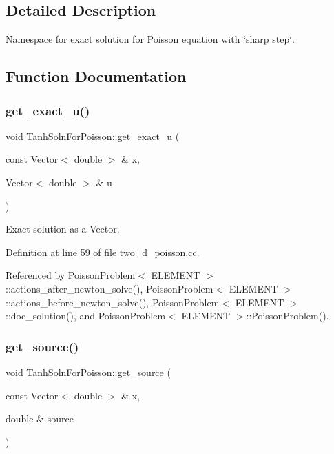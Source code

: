 \subsection{Detailed Description}
Namespace for exact solution for Poisson equation with \char`\"{}sharp step\char`\"{}. 

\subsection{Function Documentation}
\mbox{\label{namespaceTanhSolnForPoisson_af7896e9c18ce6438c73ae2a875e8b7de}} 
\subsubsection{\texorpdfstring{get\+\_\+exact\+\_\+u()}{get\_exact\_u()}}
{\footnotesize\ttfamily void Tanh\+Soln\+For\+Poisson\+::get\+\_\+exact\+\_\+u (\begin{DoxyParamCaption}\item[{const Vector$<$ double $>$ \&}]{x,  }\item[{Vector$<$ double $>$ \&}]{u }\end{DoxyParamCaption})}



Exact solution as a Vector. 



Definition at line 59 of file two\+\_\+d\+\_\+poisson.\+cc.



Referenced by Poisson\+Problem$<$ E\+L\+E\+M\+E\+N\+T $>$\+::actions\+\_\+after\+\_\+newton\+\_\+solve(), Poisson\+Problem$<$ E\+L\+E\+M\+E\+N\+T $>$\+::actions\+\_\+before\+\_\+newton\+\_\+solve(), Poisson\+Problem$<$ E\+L\+E\+M\+E\+N\+T $>$\+::doc\+\_\+solution(), and Poisson\+Problem$<$ E\+L\+E\+M\+E\+N\+T $>$\+::\+Poisson\+Problem().

\mbox{\label{namespaceTanhSolnForPoisson_ae1b9d6789ff301e3d63a4e292213036c}} 
\subsubsection{\texorpdfstring{get\+\_\+source()}{get\_source()}}
{\footnotesize\ttfamily void Tanh\+Soln\+For\+Poisson\+::get\+\_\+source (\begin{DoxyParamCaption}\item[{const Vector$<$ double $>$ \&}]{x,  }\item[{double \&}]{source }\end{DoxyParamCaption})}



